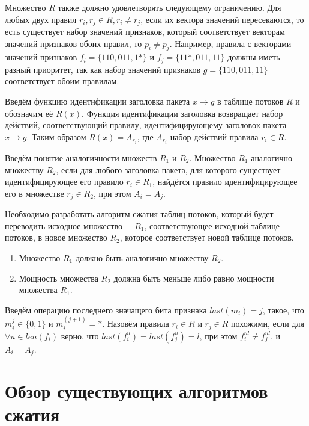 \documentclass[a4paper, 12pt, titlepage, finall]{extreport}
\begin{document}
        Множество \(R\) также должно удовлетворять следующему ограничению. 
        Для любых двух правил \(r_i,r_j\in R,r_i\not= r_j\), если их вектора значений пересекаются, то есть существует набор значений признаков, 
        который соответствует векторам значений признаков обоих правил, то \(p_i\not= p_j\). 
        Например, правила с векторами значений признаков \(f_i=\{110, 011, 1*\}\) и \(f_j=\{11*, 011, 11\}\) должны иметь разный приоритет, 
        так как набор значений признаков \(g=\{110, 011, 11\}\) соответствует обоим правилам.
        
        Введём функцию идентификации заголовка пакета \(x \rightarrow g\) в таблице потоков \(R\) и обозначим её \(R(x)\).
        Функция идентификации заголовка возвращает набор действий, соответствующий правилу, идентифицирующему заголовок пакета \(x \rightarrow g\).
        Таким образом \(R(x) = A_{r_i}\), где \(A_{r_i}\) набор действий правила \(r_i \in R\).

        Введём понятие аналогичности множеств \(R_1\) и \(R_2\).
        Множество \(R_1\) аналогично множеству \(R_2\), если для любого заголовка пакета, для которого существует идентифицирующее его правило \(r_i \in R_1\), 
        найдётся правило идентифицирующее его в множестве \(r_j \in R_2\), при этом \(A_i = A_j\).

        Необходимо разработать алгоритм сжатия таблиц потоков, который будет переводить исходное множество $-$ \(R_1\), соответствующее исходной таблице потоков, в
        новое множество \(R_2\), которое соответствует новой таблице потоков.
        \begin{enumerate}
            \item Множество \(R_1\) должно быть аналогично множеству \(R_2\).
            \item Мощность множества \(R_2\) должна быть меньше либо равно мощности множества \(R_1\).
        \end{enumerate}

        Введём операцию последнего значащего бита признака \(last(m_i) = j\), такое, что \(m_i^j \in \{0, 1\}\) и \(m_i^{(j+1)} = *\). 
        Назовём правила \(r_i \in R\) и \(r_j \in R\) похожими, 
        если для \(\forall u \in len(f_i)\) верно, что \(last(f_i^u) = last(f_j^u) = l\), при этом \(f_i^{ul} \neq f_j^{ul}\), и \(A_i = A_j\).



    \chapter{Обзор существующих алгоритмов сжатия}
\end{document}
